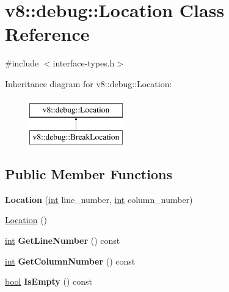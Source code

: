\hypertarget{classv8_1_1debug_1_1Location}{}\section{v8\+:\+:debug\+:\+:Location Class Reference}
\label{classv8_1_1debug_1_1Location}


{\ttfamily \#include $<$interface-\/types.\+h$>$}

Inheritance diagram for v8\+:\+:debug\+:\+:Location\+:\begin{figure}[H]
\begin{center}
\leavevmode
\includegraphics[height=2.000000cm]{classv8_1_1debug_1_1Location}
\end{center}
\end{figure}
\subsection*{Public Member Functions}
\begin{DoxyCompactItemize}
\item 
\mbox{\label{classv8_1_1debug_1_1Location_a2a052842904de454cf3e1d868a82d966}} 
{\bfseries Location} (\mbox{\hyperlink{classint}{int}} line\+\_\+number, \mbox{\hyperlink{classint}{int}} column\+\_\+number)
\item 
\mbox{\hyperlink{classv8_1_1debug_1_1Location_a55c42476163daed1bd299cd28f0fb689}{Location}} ()
\item 
\mbox{\label{classv8_1_1debug_1_1Location_a2925f26933a27f9e00a1d755abf0db09}} 
\mbox{\hyperlink{classint}{int}} {\bfseries Get\+Line\+Number} () const
\item 
\mbox{\label{classv8_1_1debug_1_1Location_a16f4db252e89fb7da0f2db19c1e698fe}} 
\mbox{\hyperlink{classint}{int}} {\bfseries Get\+Column\+Number} () const
\item 
\mbox{\label{classv8_1_1debug_1_1Location_a4665ffcd96d3cca10d7661ff21d2ad68}} 
\mbox{\hyperlink{classbool}{bool}} {\bfseries Is\+Empty} () const
\end{DoxyCompactItemize}


